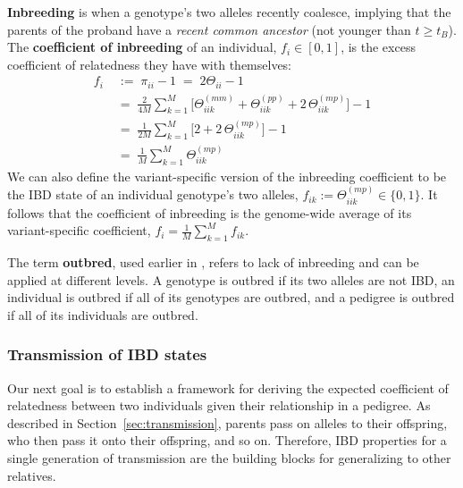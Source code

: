 \documentclass[12pt]{article}
\numberwithin{equation}{section}
\begin{document}
\textbf{Inbreeding} is when a genotype's two alleles recently coalesce, implying that the parents of the proband have a \emph{recent common ancestor} (not younger than $t\geq t_B$).
The \textbf{coefficient of inbreeding} of an individual, $f_i \in [0,1]$, is the excess coefficient of relatedness they have with themselves:
\begin{equation}\label{eq:inbreeding}
\begin{aligned}
    f_i \;&:=\; \pi_{ii} - 1 \;=\; 2\Theta_{ii} - 1 \\[4pt]
    \;&=\; \frac{2}{4M} \sum_{k=1}^{M} \Big[ \Theta^{(mm)}_{iik} + \Theta^{(pp)}_{iik} + 2\,\Theta^{(mp)}_{iik} \Big] - 1 \\[4pt]
    \;&=\; \frac{1}{2M} \sum_{k=1}^{M} \Big[ 2 + 2\,\Theta^{(mp)}_{iik} \Big] - 1 \\[4pt]
    \;&=\; \frac{1}{M} \sum_{k=1}^{M} \Theta^{(mp)}_{iik}
\end{aligned}
\end{equation}
We can also define the variant-specific version of the inbreeding coefficient to be the IBD state of an individual genotype's two alleles, $f_{ik} := \Theta^{(mp)}_{iik} \in \{0,1\}$.
It follows that the coefficient of inbreeding is the genome-wide average of its variant-specific coefficient, $f_i = \frac{1}{M} \sum_{k=1}^{M} f_{ik}$.

The term \textbf{outbred}, used earlier in , refers to lack of inbreeding and can be applied at different levels.
A genotype is outbred if its two alleles are not IBD, an individual is outbred if all of its genotypes are outbred, and a pedigree is outbred if all of its individuals are outbred.

\subsubsection{Transmission of IBD states}\label{sec:ibd-transmission}
Our next goal is to establish a framework for deriving the expected coefficient of relatedness between two individuals given their relationship in a pedigree.
As described in Section~\ref{sec:transmission}, parents pass on alleles to their offspring, who then pass it onto their offspring, and so on.
Therefore, IBD properties for a single generation of transmission are the building blocks for generalizing to other relatives.
\end{document}
